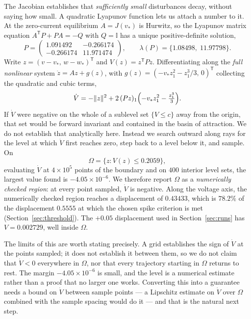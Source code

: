 \documentclass[11pt,a4paper]{article}
\begin{document}
The Jacobian establishes that \emph{sufficiently small} disturbances decay, without saying how small. A quadratic Lyapunov function lets us attach a number to it. At the zero-current equilibrium $A=J(v_*)$ is Hurwitz, so the Lyapunov matrix equation $A^{\mathsf{T}}P+PA=-Q$ with $Q=\mathbb{I}$ has a unique positive-definite solution,
\begin{equation}
  P=\begin{pmatrix}1.091492 & -0.266174\\ -0.266174 & 11.971474\end{pmatrix},
  \qquad \lambda(P)=\{1.08498,\;11.97798\}.
  \label{eq:lyapP}
\end{equation}
Write $z=(v-v_*,\,w-w_*)^{\mathsf{T}}$ and $V(z)=z^{\mathsf{T}}Pz$. Differentiating along the \emph{full nonlinear} system $\dot z=Az+g(z)$, with $g(z)=(-v_*z_1^2-z_1^3/3,\,0)^{\mathsf{T}}$ collecting the quadratic and cubic terms,
\begin{equation}
  \dot V=-\lVert z\rVert^2+2\,(Pz)_1\Bigl(-v_*z_1^2-\tfrac{z_1^3}{3}\Bigr).
  \label{eq:Vdot}
\end{equation}
If $\dot V$ were negative on the whole of a sublevel set $\{V\le c\}$ away from the origin, that set would be forward invariant and contained in the basin of attraction. We do not establish that analytically here. Instead we search outward along rays for the level at which $\dot V$ first reaches zero, step back to a level below it, and sample. On
\begin{equation}
  \Omega=\{z:V(z)\le 0.2059\},
  \label{eq:lyapset}
\end{equation}
evaluating $\dot V$ at $4\times10^5$ points of the boundary and on $400$ interior level sets, the largest value found is $-4.05\times10^{-6}$. We therefore report $\Omega$ as a \emph{numerically checked region}: at every point sampled, $\dot V$ is negative. Along the voltage axis, the numerically checked region reaches a displacement of $0.43433$, which is $78.2\%$ of the displacement $0.5555$ at which the chosen spike criterion is met (Section~\ref{sec:threshold}). The $+0.05$ displacement used in Section~\ref{sec:runs} has $V=0.002729$, well inside $\Omega$.

The limits of this are worth stating precisely. A grid establishes the sign of $\dot V$ at the points sampled; it does not establish it between them, so we do not claim that $\dot V<0$ everywhere in $\Omega$, nor that every trajectory starting in $\Omega$ returns to rest. The margin $-4.05\times10^{-6}$ is small, and the level is a numerical estimate rather than a proof that no larger one works. Converting this into a guarantee needs a bound on $\dot V$ between sample points --- a Lipschitz estimate on $\dot V$ over $\Omega$ combined with the sample spacing would do it --- and that is the natural next step.
\end{document}
